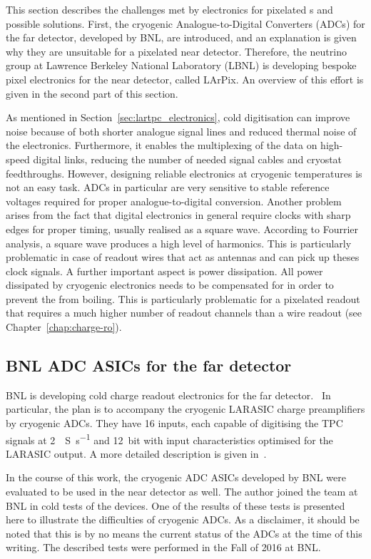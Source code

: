 This section describes the challenges met by electronics for pixelated \lartpc{}s and possible solutions.
First, the cryogenic Analogue-to-Digital Converters (ADCs) for the \dune{} far detector, developed by BNL, are introduced, and an explanation is given why they are unsuitable for a pixelated near detector.
Therefore, the neutrino group at Lawrence Berkeley National Laboratory (LBNL) is developing bespoke pixel electronics for the near detector, called LArPix.
An overview of this effort is given in the second part of this section.

As mentioned in Section~\ref{sec:lartpc_electronics}, cold digitisation can improve noise because of both shorter analogue signal lines and reduced thermal noise of the electronics.
Furthermore, it enables the multiplexing of the data on high-speed digital links, reducing the number of needed signal cables and cryostat feedthroughs.
However, designing reliable electronics at cryogenic temperatures is not an easy task.
ADCs in particular are very sensitive to stable reference voltages required for proper analogue-to-digital conversion.
Another problem arises from the fact that digital electronics in general require clocks with sharp edges for proper timing, usually realised as a square wave.
According to Fourrier analysis, a square wave produces a high level of harmonics.
This is particularly problematic in case of readout wires that act as antennas and can pick up theses clock signals.
A further important aspect is power dissipation.
All power dissipated by cryogenic electronics needs to be compensated for in order to prevent the \lar{} from boiling.
This is particularly problematic for a pixelated readout that requires a much higher number of readout channels than a wire readout (see Chapter~\ref{chap:charge-ro}).


\subsection*{BNL ADC ASICs for the \dune{} far detector}

BNL is developing cold charge readout electronics for the \dune{} far detector.~\cite{protodune-sp}
In particular, the plan is to accompany the cryogenic LARASIC charge preamplifiers by cryogenic ADCs.
They have \num{16} inputs, each capable of digitising the TPC signals at \SI{2}{\mega{}S\per\second} and \SI{12}{bit} with input characteristics optimised for the LARASIC output.
A more detailed description is given in~\cite{bnl_adc}.

In the course of this work, the cryogenic ADC ASICs developed by BNL were evaluated to be used in the near detector as well.
The author joined the team at BNL in cold tests of the devices.
One of the results of these tests is presented here to illustrate the difficulties of cryogenic ADCs.
As a disclaimer, it should be noted that this is by no means the current status of the ADCs at the time of this writing.
The described tests were performed in the Fall of 2016 at BNL.

